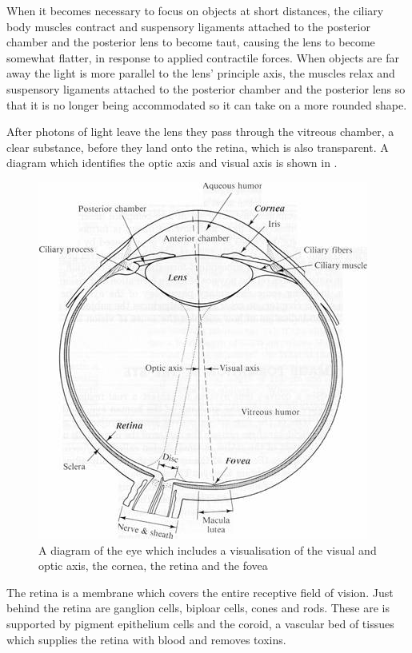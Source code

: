 When it becomes necessary to focus on objects at short distances, the
ciliary body muscles contract and suspensory ligaments attached to the
posterior chamber and the posterior lens to become taut, causing the
lens to become somewhat flatter, in response to applied contractile
forces. When objects are far away the light is more parallel to the
lens' principle axis, the muscles relax and suspensory ligaments
attached to the posterior chamber and the posterior lens so that it
is no longer being accommodated so it can take on a more rounded shape.

After photons of light leave the lens they pass through the vitreous
chamber, a clear substance, before they land onto the retina, which
is also transparent. A diagram which identifies the optic axis and
visual axis is shown in .

\begin{figure}[htbp]
  \centering
    \includegraphics{figures/eye_diagram}
  \caption{A diagram of the eye which includes a visualisation of the visual
   and optic axis, the cornea, the retina and the fovea}
  \label{fig:optic_axis}
\end{figure}

The retina is a membrane which covers the entire receptive field of vision.\cite{}
Just behind the retina are ganglion cells, biploar cells, cones and rods.
These are is supported by pigment epithelium cells and the coroid, a vascular
bed of tissues which supplies the retina with blood and removes toxins.
\cite{lutty1996localization}

